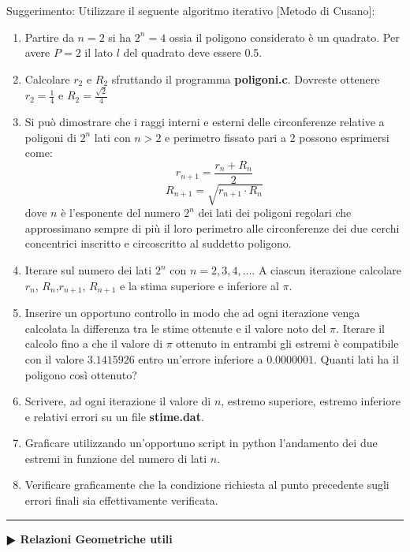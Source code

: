 \documentclass[11pt]{article}
\begin{document}
Suggerimento: Utilizzare il seguente algoritmo iterativo [Metodo di Cusano]:
\begin{enumerate}
\item Partire da $n = 2$ si ha $2^n = 4$ ossia  il poligono considerato è un quadrato. Per avere $P=2$ il lato $l$ del quadrato deve essere 0.5.
\item Calcolare $r_2$ e $R_2$ sfruttando il programma \textbf{poligoni.c}. Dovreste ottenere $r_2 = \frac{1}{4}$ e $R_2 = \frac{\sqrt{2}}{4}$
\item Si pu\`o dimostrare che i raggi interni e esterni delle circonferenze relative a poligoni di $2^n$ lati con $n>2$  e perimetro fissato pari a 2 possono esprimersi come:
$$r_{n+1} = \frac{r_n+R_n}{2}$$
$$R_{n+1} =\sqrt{r_{n+1} \cdot  R_{n}}$$
dove $n$ è l’esponente del numero $2^n$
dei lati dei poligoni regolari che approssimano
sempre di più il loro perimetro alle circonferenze dei due cerchi concentrici inscritto e circoscritto al suddetto poligono. 
\item Iterare sul numero dei lati $2^n$ con $n=2,3,4,...$. A ciascun iterazione calcolare $r_n$, $R_n$,$r_{n+1}$, $R_{n+1}$ e la stima superiore e inferiore al $\pi$.  
\item Inserire un opportuno controllo in modo che ad ogni iterazione venga calcolata la differenza tra le stime ottenute e il valore noto del $\pi$. Iterare il calcolo fino a che il valore di $\pi$ ottenuto in entrambi gli estremi \`e compatibile con il valore $3.1415926$ entro un'errore inferiore a $0.0000001$. Quanti lati ha il poligono cos\`i ottenuto?
\item Scrivere, ad ogni iterazione il valore di $n$, estremo superiore, estremo inferiore e relativi errori su un file \textbf{stime.dat}.
\item Graficare utilizzando un'opportuno script in python l'andamento dei due estremi in funzione del numero di lati $n$. 
\item Verificare graficamente che la condizione richiesta al punto precedente sugli errori finali sia effettivamente verificata.
\end{enumerate}



\hrule
\vspace{2mm}
\textbf{$\RHD$ Relazioni Geometriche utili}
\vspace{2mm}
\end{document}
